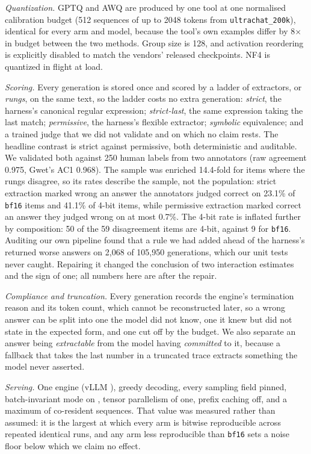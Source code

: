 \documentclass[conference]{IEEEtran}
\begin{document}
\emph{Quantization.} GPTQ and AWQ are produced by one tool at one normalised calibration
budget (512 sequences of up to 2048 tokens from \texttt{ultrachat\_200k}), identical for
every arm and model, because the tool's own examples differ by 8$\times$ in budget between
the two methods. Group size is 128, and activation reordering is explicitly disabled to match
the vendors' released checkpoints. NF4 is quantized in flight at load.

\emph{Scoring.} Every generation is stored once and scored by a ladder of extractors, or
\emph{rungs}, on the same text, so the ladder costs no extra generation: \emph{strict}, the
harness's canonical regular expression; \emph{strict-last}, the same expression taking the last
match; \emph{permissive}, the harness's flexible extractor; \emph{symbolic} equivalence; and a
trained judge \citep{chen2025xverify} that we did not validate and on which no claim rests. The
headline contrast is strict against permissive, both deterministic and auditable. We validated
both against 250 human labels from two annotators (raw agreement 0.975, Gwet's AC1 0.968). The
sample was enriched 14.4-fold for items where the rungs disagree, so its rates describe the
sample, not the population: strict extraction marked wrong an answer the annotators judged
correct on 23.1\% of \texttt{bf16} items and 41.1\% of 4-bit items, while permissive
extraction marked correct an answer they judged wrong on at most 0.7\%. The 4-bit rate is
inflated further by composition: 50 of the 59 disagreement items are 4-bit, against 9 for
\texttt{bf16}.
Auditing our own pipeline found that a rule we had added ahead of the harness's returned worse
answers on 2{,}068 of 105{,}950 generations, which our unit tests never caught. Repairing it
changed the conclusion of two interaction estimates and the sign of one; all numbers here are
after the repair.

\emph{Compliance and truncation.} Every generation records the engine's termination reason and
its token count, which cannot be reconstructed later, so a wrong answer can be split into one
the model did not know, one it knew but did not state in the expected form, and one cut off by
the budget. We also separate an answer being \emph{extractable} from the model having
\emph{committed} to it, because a fallback that takes the last number in a truncated trace
extracts something the model never asserted.

\emph{Serving.} One engine (vLLM \hEightEngine), greedy decoding, every sampling field pinned,
batch-invariant mode on \citep{he2025nondeterminism}, tensor parallelism of one, prefix
caching off, and a maximum of \hEightFrozenB{} co-resident sequences. That value was measured
rather than assumed: it is the largest at which every arm is bitwise reproducible across
repeated identical runs, and any arm less reproducible than \texttt{bf16} sets a noise floor
below which we claim no effect.
\end{document}
